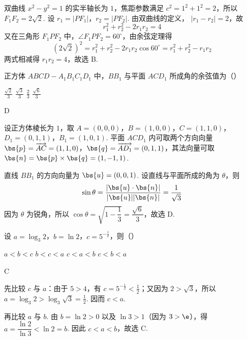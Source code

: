\begin{solution}
双曲线 \(x^2-y^2=1\) 的实半轴长为 \(1\)，焦距参数满足
\(c^2=1^2+1^2=2\)，所以 \(F_1F_2=2\sqrt{2}\). 设
\(r_1=|PF_1|\)，\(r_2=|PF_2|\). 由双曲线的定义，
\(|r_1-r_2|=2\)，故
\[
r_1^2+r_2^2-2r_1r_2=4
\]
又在三角形 \(F_1PF_2\) 中，\(\angle F_1PF_2=60^{\circ}\)，由余弦定理得
\[
(2\sqrt{2})^2=r_1^2+r_2^2-2r_1r_2\cos60^{\circ}=r_1^2+r_2^2-r_1r_2
\]
两式相减得 \(r_1r_2=4\)，故选 B.
\end{solution}

\begin{problem}
正方体 \(ABCD - A_{1}B_{1}C_{1}D_{1}\) 中，\(BB_{1}\) 与平面 \(ACD_{1}\) 所成角的余弦值为（\quad）

\choices
    {\(\frac{\sqrt{2}}{3}\)}
    {\(\frac{\sqrt{3}}{3}\)}
    {\(\frac{2}{3}\)}
    {\(\frac{\sqrt{6}}{3}\)}
\end{problem}

\begin{answer}
D
\end{answer}

\begin{solution}
设正方体棱长为 \(1\)，取
\(A=(0,0,0)\)，\(B=(1,0,0)\)，\(C=(1,1,0)\)，\(D_1=(0,1,1)\)，\(B_1=(1,0,1)\).
平面 \(ACD_1\) 内可取两个方向向量
\(\bs{p}=\overrightarrow{AC}=(1,1,0)\)，\(\bs{q}=\overrightarrow{AD_1}=(0,1,1)\)，其法向量可取
\(\bs{n}=\bs{p}\times\bs{q}=(1,-1,1)\).

直线 \(BB_1\) 的方向向量为 \(\bs{u}=(0,0,1)\). 设直线与平面所成的角为 \(\theta\)，则
\[
\sin\theta=\frac{|\bs{u}\cdot\bs{n}|}{|\bs{u}||\bs{n}|}=\frac1{\sqrt3}
\]
因为 \(\theta\) 为锐角，所以
\(\cos\theta=\sqrt{1-\dfrac13}=\dfrac{\sqrt6}{3}\)，故选 D.
\end{solution}

\begin{problem}
设 \(a = \log_3 2\)，\(b = \ln 2\)，\(c = 5^{-\frac{1}{2}}\)，则（\quad）

\choices
    {\(a < b < c\)}
    {\(b < c < a\)}
    {\(c < a < b\)}
    {\(c < b < a\)}
\end{problem}

\begin{answer}
C
\end{answer}

\begin{solution}
先比较 \(c\) 与 \(a\)：由于 \(5>4\)，有 \(c=5^{-\frac{1}{2}}<\frac{1}{2}\)；又因为 \(2>\sqrt3\)，所以
\(a=\log_3 2>\log_3\sqrt3=\frac{1}{2}\). 因而 \(c<a\).

再比较 \(a\) 与 \(b\). 由 \(b=\ln2>0\) 以及 \(\ln3>1\)（因为 \(3>\e\)），得
\(a=\dfrac{\ln2}{\ln3}<\ln2=b\). 因此 \(c<a<b\)，故选 C.
\end{solution}

